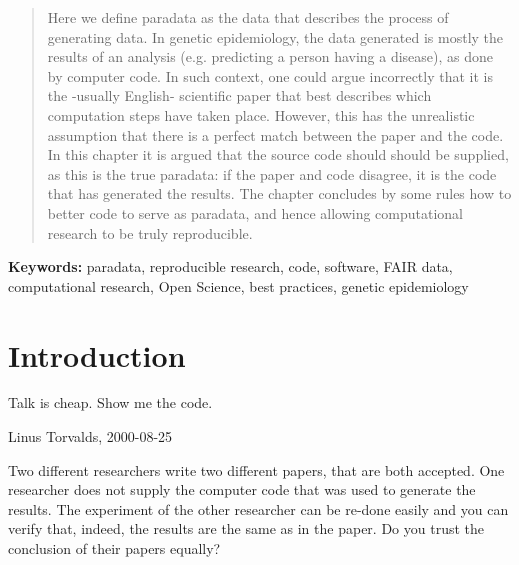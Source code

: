 %
%

\begin{abstract}

Here we define paradata as the data that describes the process of generating data.
In genetic epidemiology, the data generated is mostly the results 
of an analysis (e.g. predicting a person having a disease),
as done by computer code.
In such context, one could argue incorrectly that
it is the -usually English- scientific paper that best describes which computation steps 
have taken place.
However, this has the unrealistic 
assumption that there is a perfect match between the paper and the code.
In this chapter it is argued that the source code should should be supplied,
as this is the true paradata: if the paper and code disagree, it is the
code that has generated the results.
The chapter concludes by some rules how to better code to serve as paradata,
and hence allowing computational research to be truly reproducible.

\end{abstract}

{\bf Keywords:} paradata, reproducible research, code, software,
FAIR data, computational research, Open Science, best practices,
genetic epidemiology

\section{Introduction}

\epigraph{
  Talk is cheap. Show me the code.
}{
  Linus Torvalds, 2000-08-25
}



Two different researchers write two different papers,
that are both accepted. One researcher does not supply the
computer code that was used to generate the results.
The experiment of the other researcher can be re-done easily
and you can verify that, indeed, the results are the same
as in the paper.
Do you trust the conclusion of their papers equally?

